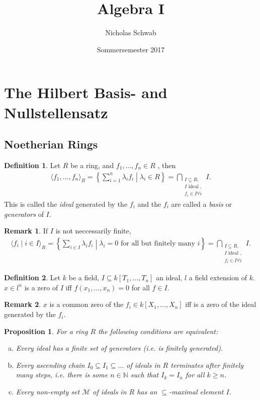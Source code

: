 \documentclass[DIV=14,parskip=half]{scrartcl}
\title{Algebra I}
\author{Nicholas Schwab}
\date{Sommersemester 2017}
\newtheorem{prop}{Proposition}[subsection]
\theoremstyle{definition}
\newtheorem{defi}{Definition}[subsection]
\newtheorem*{rem}{Remark}%
\newcommand{\N}{\mathbb{N}}
\begin{document}
\maketitle
\section{The Hilbert Basis- and Nullstellensatz}
\subsection{Noetherian Rings}
\begin{defi}\label{def:generatedIdeal}
 Let $R$ be a ring, and $f_1,\dots, f_n\in R$ , then 
 \begin{align*}\langle f_1,\dots,  f_n\rangle_R = \left\{\sum_{i=1}^n \lambda_i f_i \middle| \lambda_i \in R\right\} = \bigcap_{\substack{I\subseteq R,\\ I \text{ ideal },\\ f_i\in I\forall i}} I.
 \end{align*}
This is called the \emph{ideal} generated by the $f_i$ and the $f_i$ are called a \emph{basis} or \emph{generators} of $I$. 
\end{defi}
\begin{rem}
 If $I$ is not neccessarily finite, 
 \begin{align*}
\langle f_i\mid i\in I\rangle_R = \left\{\sum_{i\in I} \lambda_i f_i \middle| \lambda_i = 0 \text{ for all but finitely many } i\right\} = \bigcap_{\substack{I\subseteq R,\\ I \text{ ideal },\\ f_i\in I\forall i}} I.
\end{align*}
\end{rem}
\begin{defi}\label{def:zeroOfIdeal}
 Let $k$ be a field, $I\subseteq k[T_1,\dots, T_n]$ an ideal, $l$ a field extension of $k$. $x\in l^n$ is a zero of $I$ iff $f(x_1,\dots,x_n) = 0$ for all $f\in I$. 
\end{defi}
\begin{rem}
 $x$ is a common zero of the $f_i\in k[X_1,\dots,X_n]$ iff is a zero of the ideal generated by the $f_i$.
\end{rem}
\begin{prop}\label{prop:Noetherian}
 For a ring $R$ the following conditions are equivalent:
 \begin{enumerate}[a)]
  \item Every ideal has a finite set of generators (i.e. is finitely generated).
  \item Every ascending chain $I_0 \subseteq I_1 \subseteq \dots$ of ideals in $R$ terminates after finitely many steps, i.e. there is some $n\in\N$ such that $I_k=I_n$ for all $k\geq n$.
  \item Every non-empty set $\mathcal{M}$ of ideals in $R$ has an $\subseteq$-maximal element $I$. 
 \end{enumerate}

\end{prop}
\end{document}
